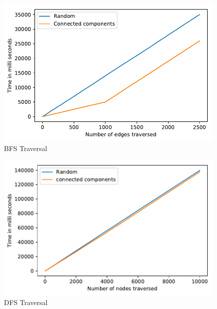 \documentclass[letterpaper, 11 pt, conference]{ieeeconf}  %
\begin{document}
\begin{figure}
  \includegraphics[width=\linewidth]{plot1.pdf}
  \caption{BFS Traversal}
  \label{fig:plot1}
\end{figure}

\begin{figure}
  \includegraphics[width=\linewidth]{plot2.pdf}
  \caption{DFS Traversal}
  \label{fig:plot2}
\end{figure}
\end{document}
